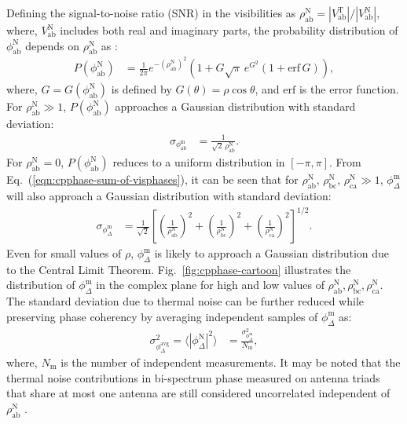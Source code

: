 \documentclass[
reprint,
superscriptaddress,
amsmath,
amssymb,
aps,
prd
]{revtex4-1}
\begin{document}
Defining the signal-to-noise ratio (SNR) in the visibilities as $\rho_\textrm{ab}^\textrm{N} = |V_\textrm{ab}^\textrm{T}|/|V_\textrm{ab}^\textrm{N}|$, where, $V_\textrm{ab}^\textrm{N}$ includes both real and imaginary parts, the probability distribution of $\phi_\textrm{ab}^\textrm{N}$ depends on $\rho_\textrm{ab}^\textrm{N}$ as \cite{cra89}:
\begin{align}
  P(\phi_\textrm{ab}^\textrm{N}) &= \frac{1}{2\pi} e^{-(\rho_\textrm{ab}^\textrm{N})^2} \left(1 + G\sqrt{\pi}\,e^{G^2}(1+\mathrm{erf}\,G)\right),
\end{align}
where, $G=G(\phi_\textrm{ab}^\textrm{N})$ is defined by $G(\theta)=\rho\cos\theta$, and $\mathrm{erf}$ is the error function. For $\rho_\textrm{ab}^\textrm{N}\gg 1$, $P(\phi_\textrm{ab}^\textrm{N})$ approaches a Gaussian distribution with standard deviation:
\begin{align}
  \sigma_{\phi_\textrm{ab}^\textrm{m}} &= \frac{1}{\sqrt{2}\,\rho_\textrm{ab}^\textrm{N}}.
\end{align}
For $\rho_\textrm{ab}^\textrm{N}=0$, $P(\phi_\textrm{ab}^\textrm{N})$ reduces to a uniform distribution in $[-\pi,\pi]$. From Eq.~(\ref{eqn:cpphase-sum-of-visphases}), it can be seen that for $\rho_\textrm{ab}^\textrm{N},\,\rho_\textrm{bc}^\textrm{N},\,\rho_\textrm{ca}^\textrm{N}\gg 1$, $\phi_\Delta^\textrm{m}$ will also approach a Gaussian distribution with standard deviation:
\begin{align}
  \sigma_{\phi_\Delta^\textrm{m}} &= \frac{1}{\sqrt{2}}\left[\left(\frac{1}{\rho_\textrm{ab}^\textrm{N}}\right)^2 + \left(\frac{1}{\rho_\textrm{bc}^\textrm{N}}\right)^2 + \left(\frac{1}{\rho_\textrm{ca}^\textrm{N}}\right)^2\right]^{1/2}. \label{eqn:cprms-noise}
\end{align}
Even for small values of $\rho$, $\phi_\Delta^\textrm{m}$ is likely to approach a Gaussian distribution due to the Central Limit Theorem. Fig.~\ref{fig:cpphase-cartoon} illustrates the distribution of $\phi_\Delta^\textrm{m}$ in the complex plane for high and low values of $\rho_\textrm{ab}^\textrm{N},\rho_\textrm{bc}^\textrm{N},\rho_\textrm{ca}^\textrm{N}$. The standard deviation due to thermal noise can be further reduced while preserving phase coherency by averaging independent samples of $\phi_\Delta^\textrm{m}$ as:
\begin{align}
  \sigma_{\phi_\Delta^\textrm{avg}}^2 = \bigg\langle |\phi_\Delta^\textrm{N}|^2\bigg\rangle &= \frac{\sigma_{\phi_\Delta^\textrm{m}}^2}{N_\textrm{m}},
\end{align}
where, $N_\textrm{m}$ is the number of independent measurements. It may be noted that the thermal noise contributions in bi-spectrum phase measured on antenna triads that share at most one antenna are still considered uncorrelated independent of $\rho_\textrm{ab}^\textrm{N}$ \cite{kul89}.
\end{document}
